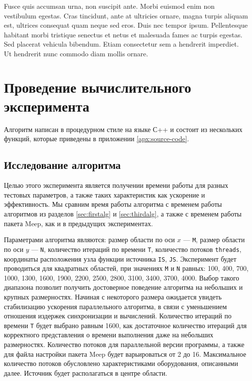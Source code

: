 \documentclass[14pt,a4paper]{extarticle} %
\begin{document}
Fusce quis accumsan urna, non suscipit ante. Morbi euismod enim non vestibulum egestas. Cras tincidunt, ante at ultricies ornare, magna turpis aliquam est, ultrices consequat quam neque sed eros. Duis nec tempor ipsum. Pellentesque habitant morbi tristique senectus et netus et malesuada fames ac turpis egestas. Sed placerat vehicula bibendum. Etiam consectetur sem a hendrerit imperdiet. Ut hendrerit nunc commodo diam mollis ornare.


\section{Проведение вычислительного эксперимента}

Алгоритм написан в процедурном стиле на языке С++ и состоит из нескольких функций, которые приведены в приложении \ref{apx:source-code}. 

\subsection{Исследование алгоритма}

Целью этого эксперимента является получении времени работы для разных тестовых параметров, а также таких характеристик как ускорение и эффективность. Мы сравним время работы алгоритма с временем работы алгоритмов из разделов \ref{sec:firstalg} и \ref{sec:thirdalg}, а также с временем работы пакета Meep, как и в предыдущих экспериментах.

Параметрами алгоритма являются: размер области по оси $x$ --- \texttt{M}, размер области по оси $y$ --- \texttt{N}, количество итераций по времени \texttt{T}, количество потоков \texttt{threads}, координаты расположения узла функции источника \texttt{IS}, \texttt{JS}. Эксперимент будет проводиться для квадратных областей, при значениях \texttt{M} и \texttt{N} равных: 100, 400, 700, 1000, 1300, 1600, 1900, 2200, 2500, 2800, 3100, 3400, 3700, 4000. Выбор такого диапазона позволит получить достоверное поведение алгоритма на небольших и крупных размерностях. Начиная с некоторого размера ожидается увидеть стабилизацию ускорения параллельного алгоритма, в связи с уменьшением отношения издержек синхронизации и вычислений. Количество итераций по времени \texttt{T} будет выбрано равным 1600, как достаточное количество итераций для корректного представления о времени выполнения даже на небольших размерностях. Количество потоков для параллельной версии программы, а также для файла настройки пакета Meep будет варьироваться от 2 до 16. Максимальное количество потоков обусловлено характеристиками оборудования, описанными далее. Источник будет располагаться в центре области.
\end{document}
